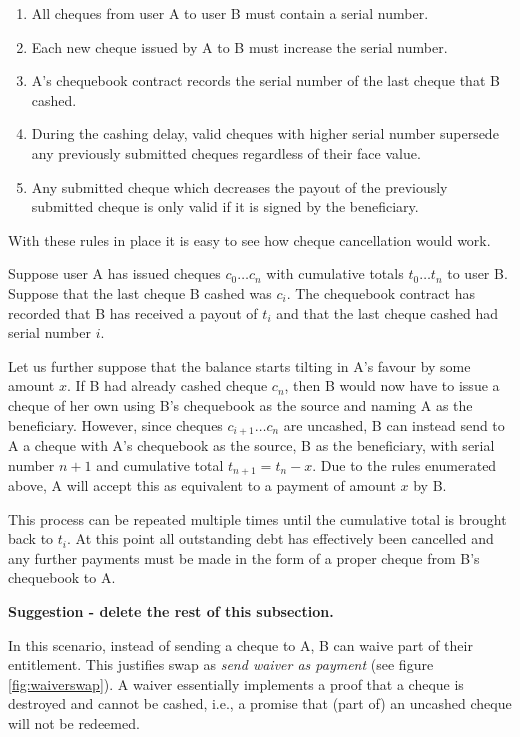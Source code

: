 \begin{enumerate}
    \item All cheques from user A to user B must contain a serial number.
    \item Each new cheque issued by A to B must increase the serial number.
    \item A's chequebook contract records the serial number of the last cheque that B cashed.
    \item During the cashing delay, valid cheques with higher serial number supersede any previously submitted cheques regardless of their face value.
    \item Any submitted cheque which decreases the payout of the previously submitted cheque is only valid if it is signed by the beneficiary.
\end{enumerate}

With these rules in place it is easy to see how cheque cancellation would work. 


Suppose user A has issued cheques $c_0 \ldots c_n$ with cumulative totals $t_0 \ldots t_n$ to user B. Suppose that the last cheque B cashed was $c_i$. The chequebook contract has recorded that B has received a payout of $t_i$ and that the last cheque cashed had serial number $i$.

Let us further suppose that the balance starts tilting in A's favour by some amount $x$. If B had already cashed cheque $c_n$, then B would now have to issue a cheque of her own using B's chequebook as the source and naming A as the beneficiary. However, since cheques $c_{i+1} \ldots c_n$  are uncashed, B can instead send to A a cheque with A's chequebook as the source, B as the beneficiary, with serial number $n+1$ and cumulative total $t_{n+1} = t_n - x$. Due to the rules enumerated above, A will accept this as equivalent to a payment of amount $x$ by B.

This process can be repeated multiple times until the cumulative total is brought back to $t_i$. At this point all outstanding debt has effectively been cancelled and any further payments must be made in the form of a proper cheque from B's chequebook to A.


\textbf{Suggestion - delete the rest of this subsection.}


In this scenario, instead of sending a cheque to A, B can waive part of their entitlement. This justifies swap as \emph{send waiver as payment} (see figure \ref{fig:waiverswap}).
A waiver essentially implements a proof that a cheque is destroyed and cannot be cashed, i.e., a promise that (part of) an uncashed cheque will not be redeemed.

